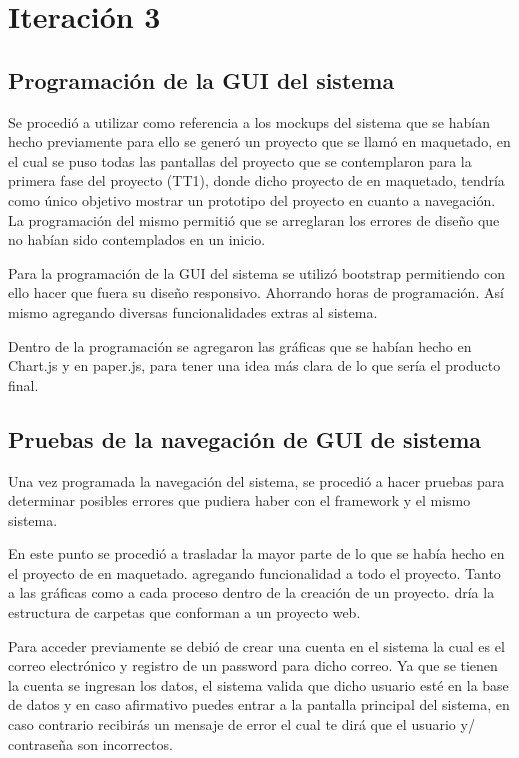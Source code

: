\section{Iteración 3} 

\subsection{Programación de la GUI del sistema } 

 Se procedió a utilizar como referencia a los mockups del sistema que se habían hecho previamente para ello se generó un proyecto que se llamó en maquetado, en el cual se puso todas las pantallas del proyecto que se contemplaron para la primera fase del proyecto (TT1), donde dicho proyecto de en maquetado, tendría como único objetivo mostrar un prototipo del proyecto en cuanto a navegación. La programación del mismo permitió que se arreglaran los errores de diseño que no habían sido contemplados en un inicio. 

Para la programación de la GUI del sistema se utilizó bootstrap permitiendo con ello hacer que fuera su diseño responsivo. Ahorrando horas de programación. Así mismo agregando diversas funcionalidades extras al sistema. 

Dentro de la programación se agregaron las gráficas que se habían hecho en Chart.js y en paper.js, para tener una idea más clara de lo que sería el producto final.


\subsection{Pruebas de la navegación de GUI de sistema}
Una vez programada la navegación del sistema, se procedió a hacer pruebas para determinar posibles errores que pudiera haber con el framework y el mismo sistema. 


En este punto se procedió a trasladar la mayor parte de lo que se había hecho en el proyecto de en maquetado. agregando funcionalidad a todo el proyecto. Tanto a las gráficas como a cada proceso dentro de la creación de un proyecto. dría la estructura de carpetas que conforman a un proyecto web. 
 

Para acceder previamente se debió de crear una cuenta en el sistema la cual es el correo electrónico y registro de un password para dicho correo. Ya que se tienen la cuenta se ingresan los datos, el sistema valida que dicho usuario esté en la base de datos y en caso afirmativo puedes entrar a la pantalla principal del sistema, en caso contrario recibirás un mensaje de error el cual te dirá que el usuario y/ contraseña son incorrectos. 


